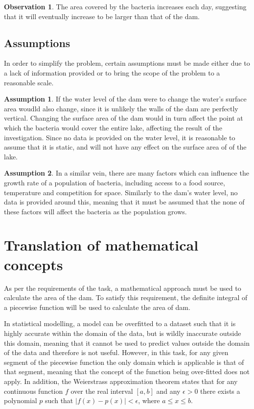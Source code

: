 \documentclass{article}
\theoremstyle{definition}
\newtheorem{assumption}{Assumption}
\newtheorem{observation}{Observation}
\begin{document}
        \begin{observation}
            The area covered by the bacteria increases each day, suggesting that it will eventually increase to be larger than that of the dam.
        \end{observation}
    
    \subsection{Assumptions}
    
        In order to simplify the problem, certain assumptions must be made either due to a lack of information provided or to bring the scope of the problem to a reasonable scale.

        \begin{assumption}
            If the water level of the dam were to change the water's surface area woudld also change, since it is unlikely the walls of the dam are perfectly vertical. Changing the surface area of the dam would in turn affect the point at which the bacteria would cover the entire lake, affecting the result of the investigation. Since no data is provided on the water level, it is reasonable to assume that it is static, and will not have any effect on the surface area of of the lake.
        \end{assumption}

        \begin{assumption} \label{asmptnBacteriaGrowth}
            In a similar vein, there are many factors which can influence the growth rate of a population of bacteria, including access to a food source, temperature and competition for space. Similarly to the dam's water level, no data is provided around this, meaning that it must be assumed that the none of these factors will affect the bacteria as the population grows.
        \end{assumption}
        
\section{Translation of mathematical concepts}
    
    As per the requirements of the task, a mathematical approach must be used to calculate the area of the dam. To satisfy this requirement, the definite integral of a piecewise function will be used to calculate the area of dam.

    In statistical modelling, a model can be overfitted to a dataset such that it is highly accurate within the domain of the data, but is wildly inaccurate outside this domain, meaning that it cannot be used to predict values outside the domain of the data and therefore is not useful. However, in this task, for any given segment of the piecewise function the only domain which is applicable is that of that segment, meaning that the concept of the function being over-fitted does not apply. In addition, the Weierstrass approximation theorem states that for any continuous function $f$ over the real interval $[a, b]$ and any $\epsilon > 0$ there exists a polynomial $p$ such that $|f(x) - p(x)| < \epsilon$, where $a \leq x \leq b$.
 
\end{document}
